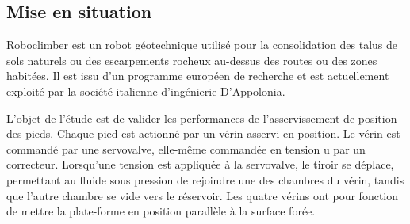 \documentclass[10pt,fleqn]{article} %
\begin{document}

\vspace{4.5cm}
\pagestyle{fancy}
\thispagestyle{plain}

\def\columnseprulecolor{\color{ocre}}
\setlength{\columnseprule}{0.4pt} 

\def\pathfig{images}

\begin{multicols}{2}

\footnotesize 

\subsection*{Mise en situation}
Roboclimber est un robot géotechnique utilisé pour la consolidation des talus de sols naturels
ou des escarpements rocheux au-dessus des routes ou des zones habitées. Il est
issu d’un programme européen de recherche et est actuellement exploité par la société italienne
d’ingénierie D’Appolonia.



L’objet de l’étude est de valider les performances de l’asservissement de position des pieds.
Chaque pied est actionné par un vérin asservi en position. Le vérin est commandé par une
servovalve, elle-même commandée en tension u par un correcteur. Lorsqu’une
tension est appliquée à la servovalve, le tiroir se déplace, permettant au fluide sous pression de
rejoindre une des chambres du vérin, tandis que l’autre chambre se vide vers le réservoir.
Les quatre vérins ont pour fonction de mettre la plate-forme en position parallèle à la surface
forée. 




\end{multicols}
\end{document}
